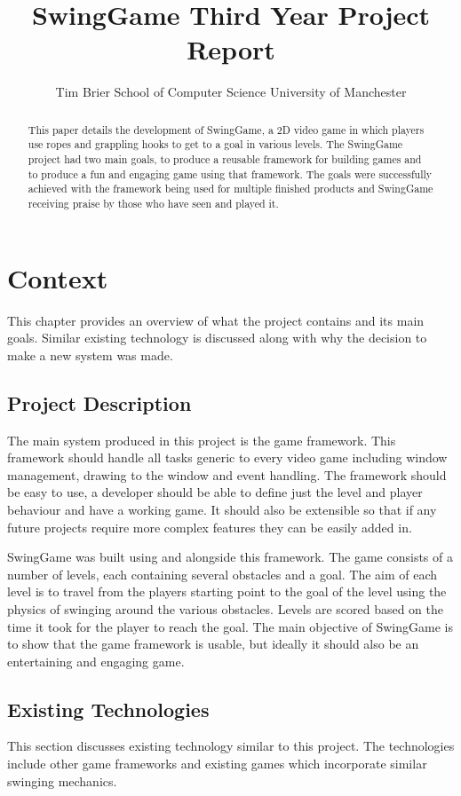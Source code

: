 \documentclass[]{report}
\title{
	SwingGame\endgraf
	Third Year Project Report
}
\author{
	\parbox{\linewidth}{
		\centering%
		Tim Brier\endgraf
		School of Computer Science\endgraf
		University of Manchester
	}
}
\date{
	\parbox{\linewidth}{
		\centering%
		April 2015\endgraf\bigskip
		Supervised by Dr Steve Pettifer
	}
}
\begin{document}
\maketitle

\begin{abstract}
This paper details the development of SwingGame, a 2D video game in which players use ropes and grappling hooks to get to a goal in various levels.  The SwingGame project had two main goals, to produce a reusable framework for building games and to produce a fun and engaging game using that framework. The goals were successfully achieved with the framework being used for multiple finished products and SwingGame receiving praise by those who have seen and played it.
\end{abstract}

\tableofcontents


\chapter{Context}
This chapter provides an overview of what the project contains and its main goals. Similar existing technology is discussed along with why the decision to make a new system was made.
	\section{Project Description}
	The main system produced in this project is the game framework. This framework should handle all tasks generic to every video game including window management, drawing to the window and event handling. The framework should be easy to use, a developer should be able to define just the level and player behaviour and have a working game. It should also be extensible so that if any future projects require more complex features they can be easily added in.
	
	SwingGame was built using and alongside this framework. The game consists of a number of levels, each containing several obstacles and a goal. The aim of each level is to travel from the players starting point to the goal of the level using the physics of swinging around the various obstacles. Levels are scored based on the time it took for the player to reach the goal. The main objective of SwingGame is to show that the game framework is usable, but ideally it should also be an entertaining and engaging game.
	\section{Existing Technologies}
	This section discusses existing technology similar to this project. The technologies include other game frameworks and existing games which incorporate similar swinging mechanics.
\end{document}

